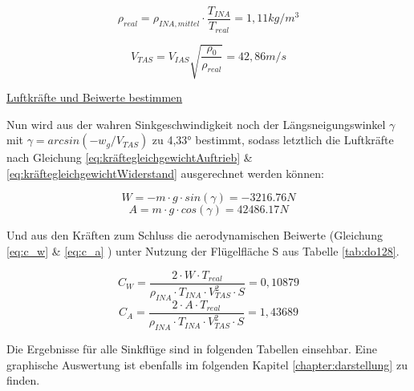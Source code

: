 \vspace{5mm}

\begin{equation*}
\rho_{real} = \rho_{INA,mittel} \cdot \frac{T_{INA}}{T_{real}} = 1,11 kg/m^3
\end{equation*}

\vspace{5mm}

\begin{equation*}
V_{TAS} = V_{IAS}\sqrt{\frac{\rho_0}{\rho_{real}}} =42,86 m/s
\end{equation*}


\vspace{5mm} \noindent
\underline{Luftkräfte und Beiwerte bestimmen}

\noindent Nun wird aus der wahren Sinkgeschwindigkeit noch der Längsneigungswinkel $\gamma$ mit \linebreak[4] $\gamma = arcsin(-w_g/V_{TAS})$ zu 4,33° bestimmt, sodass letztlich die Luftkräfte nach Gleichung \ref{eq:kräftegleichgewichtAuftrieb} \& \ref{eq:kräftegleichgewichtWiderstand} ausgerechnet werden können:

\begin{equation*}
W = - m\cdot g \cdot sin(\gamma) = -3216.76 N
\end{equation*}
\begin{equation*}
A = m\cdot g \cdot cos(\gamma) = 42486.17 N
\end{equation*}

\vspace{5mm} \noindent
Und aus den Kräften zum Schluss die aerodynamischen Beiwerte (Gleichung \ref{eq:c_w} \& \ref{eq:c_a} ) unter Nutzung der Flügelfläche S aus Tabelle \ref{tab:do128}.

\begin{equation*}
C_W = \frac{2 \cdot W \cdot T_{real}}{\rho_{INA} \cdot T_{INA} \cdot V_{TAS}^2 \cdot S} = 0,10879
\end{equation*}
\begin{equation*}
C_A = \frac{2 \cdot A \cdot T_{real}}{\rho_{INA} \cdot T_{INA} \cdot V_{TAS}^2 \cdot S} = 1,43689
\end{equation*}

\vspace{5mm} \noindent
Die Ergebnisse für alle Sinkflüge sind in folgenden Tabellen einsehbar. Eine graphische Auswertung ist ebenfalls im folgenden Kapitel \ref{chapter:darstellung} zu finden.\\

